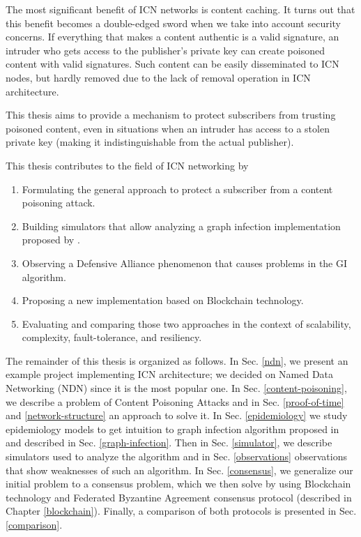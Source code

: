 The most significant benefit of ICN networks is content caching. It turns out that this benefit becomes a double-edged sword when we take into account security concerns. If everything that makes a content authentic is a valid signature, an intruder who gets access to the publisher's private key can create poisoned content with valid signatures. Such content can be easily disseminated to ICN nodes, but hardly removed due to the lack of removal operation in ICN architecture. 

This thesis aims to provide a mechanism to protect subscribers from trusting poisoned content, even in situations when an intruder has access to a stolen private key (making it indistinguishable from the actual publisher).

This thesis contributes to the field of ICN networking by 
\begin{enumerate}
    \item Formulating the general approach to protect a subscriber from a content poisoning attack.
    \item Building simulators that allow analyzing a graph infection implementation proposed by \cite{konorski2019mitigating}. 
    \item Observing a Defensive Alliance phenomenon that causes problems in the GI algorithm.
    \item Proposing a new implementation based on Blockchain technology.
    \item Evaluating and comparing those two approaches in the context of scalability, complexity, fault-tolerance, and resiliency. 
\end{enumerate}

The remainder of this thesis is organized as follows.
In Sec. \ref{ndn}, we present an example project implementing ICN architecture; we decided on Named Data Networking (NDN) since it is the most popular one.
In Sec. \ref{content-poisoning}, we describe a problem of Content Poisoning Attacks and in Sec. \ref{proof-of-time} and \ref{network-structure} an approach to solve it. In Sec. \ref{epidemiology} we study epidemiology models to get intuition to graph infection algorithm proposed in \cite{konorski2019mitigating} and described in Sec. \ref{graph-infection}. Then in Sec. \ref{simulator}, we describe simulators used to analyze the algorithm and in Sec. \ref{observations} observations that show weaknesses of such an algorithm. In Sec. \ref{consensus}, we generalize our initial problem to a consensus problem, which we then solve by using Blockchain technology and Federated Byzantine Agreement consensus protocol (described in Chapter \ref{blockchain}). Finally, a comparison of both protocols is presented in Sec. \ref{comparison}.


